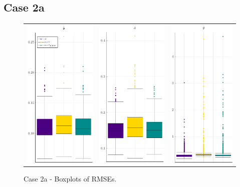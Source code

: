 \subsection{Case 2a}
\begin{figure}[H] 
	\centering
	\begin{tabular}[b]{c c c}
		\includegraphics[width=.3\textwidth]{Figures/2a/RMSE_b.pdf} & \includegraphics[width=.3\textwidth]{Figures/2a/RMSE_a.pdf} & \includegraphics[width=.3\textwidth]{Figures/2a/RMSE_t.pdf}
	\end{tabular}
	\caption{Case 2a - Boxplots of RMSEs.}
	\label{fig:bpRMSE2a}
\end{figure}

